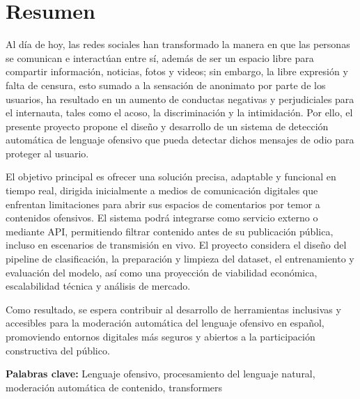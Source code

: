 \chapter*{Resumen}

Al día de hoy, las redes sociales han transformado la manera en que las personas se comunican e interactúan entre sí, además de ser un espacio libre para compartir información, noticias, fotos y videos; sin embargo, la libre expresión y falta de censura, esto sumado a la sensación de anonimato por parte de los usuarios, ha resultado en un aumento de conductas negativas y perjudiciales para el internauta, tales como el acoso, la discriminación y la intimidación. Por ello, el presente proyecto propone el diseño y desarrollo de un sistema de detección automática de lenguaje ofensivo que pueda detectar dichos mensajes de odio para proteger al usuario.

El objetivo principal es ofrecer una solución precisa, adaptable y funcional en tiempo real, dirigida inicialmente a medios de comunicación digitales que enfrentan limitaciones para abrir sus espacios de comentarios por temor a contenidos ofensivos. El sistema podrá integrarse como servicio externo o mediante API, permitiendo filtrar contenido antes de su publicación pública, incluso en escenarios de transmisión en vivo. El proyecto considera el diseño del pipeline de clasificación, la preparación y limpieza del dataset, el entrenamiento y evaluación del modelo, así como una proyección de viabilidad económica, escalabilidad técnica y análisis de mercado.

Como resultado, se espera contribuir al desarrollo de herramientas inclusivas y accesibles para la moderación automática del lenguaje ofensivo en español, promoviendo entornos digitales más seguros y abiertos a la participación constructiva del público.

\noindent\textbf{Palabras clave:} Lenguaje ofensivo, procesamiento del lenguaje natural, moderación automática de contenido, transformers
